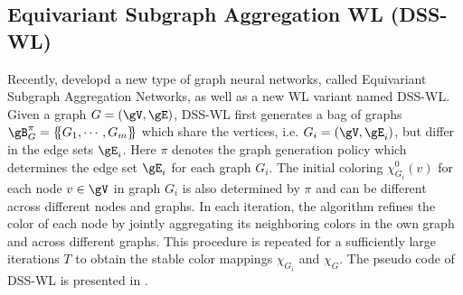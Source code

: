 \documentclass{article} %
\let\cref\crtcref
\newcommand*{\ldblbrace}{\{\mskip-5mu\{}
\newcommand*{\rdblbrace}{\}\mskip-5mu\}}
\begin{document}


\subsection{Equivariant Subgraph Aggregation WL (DSS-WL)}
\label{sec:dsswl}
Recently, \citet{bevilacqua2022equivariant} developd a new type of graph neural networks, called Equivariant Subgraph Aggregation Networks, as well as a new WL variant named DSS-WL. Given a graph $G=(\gV,\gE)$, DSS-WL first generates a bag of graphs $\gB^\pi_G=\ldblbrace G_1,\cdots,G_m\rdblbrace$ which share the vertices, i.e. $G_i=(\gV,\gE_i)$, but differ in the edge sets $\gE_i$. Here $\pi$ denotes the graph generation policy which determines the edge set $\gE_i$ for each graph $G_i$. The initial coloring $\chi_{G_i}^0(v)$ for each node $v\in\gV$ in graph $G_i$ is also determined by $\pi$ and can be different across different nodes and graphs. In each iteration, the algorithm refines the color of each node by jointly aggregating its neighboring colors in the own graph and across different graphs. This procedure is repeated for a sufficiently large iterations $T$ to obtain the stable color mappings $\chi_{G_i}$ and $\chi_G$. The pseudo code of DSS-WL is presented in \cref{alg:dsswl}. 
\end{document}
